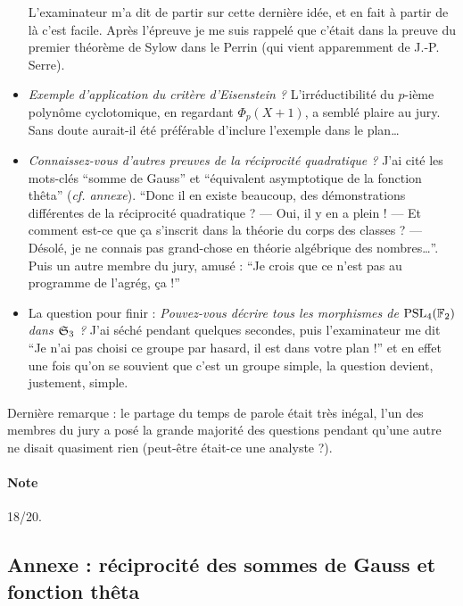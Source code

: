 \documentclass[a4paper, 11pt]{article}
\begin{document}
\begin{itemize}
  L'examinateur m'a dit de partir sur cette dernière idée, et en fait à partir
  de là c'est facile. Après l'épreuve je me suis rappelé que c'était dans la
  preuve du premier théorème de Sylow dans le Perrin (qui vient apparemment de
  J.-P. Serre).
\item \emph{Exemple d'application du critère d'Eisenstein ?} L'irréductibilité
  du $p$-ième polynôme cyclotomique, en regardant $\Phi_p(X+1)$, a semblé plaire
  au jury. Sans doute aurait-il été préférable d'inclure l'exemple dans le plan…
\item \emph{Connaissez-vous d'autres preuves de la réciprocité quadratique ?}
  J'ai cité les mots-clés \enquote{somme de Gauss} et \enquote{équivalent
    asymptotique de la fonction thêta} (\emph{cf. annexe}). \enquote{Donc il en
    existe beaucoup, des démonstrations différentes de la réciprocité
    quadratique ? --- Oui, il y en a plein ! --- Et comment est-ce que ça
    s'inscrit dans la théorie du corps des classes ? --- Désolé, je ne connais
    pas grand-chose en théorie algébrique des nombres…}.
  Puis un autre membre du jury, amusé : \enquote{Je crois que ce n'est pas au
    programme de l'agrég, ça !}
\item La question pour finir : \emph{Pouvez-vous décrire tous les morphismes de
    $\mathrm{PSL}_4(\mathbb{F}_2)$ dans $\mathfrak{S}_3$ ?} J'ai séché pendant quelques secondes,
  puis l'examinateur me dit \enquote{Je n'ai pas choisi ce groupe par hasard, il
    est dans votre plan !} et en effet une fois qu'on se souvient que c'est un
  groupe simple, la question devient, justement, simple.
\end{itemize}

Dernière remarque : le partage du temps de parole était très inégal, l'un des
membres du jury a posé la grande majorité des questions pendant qu'une autre ne
disait quasiment rien (peut-être était-ce une analyste ?).

\paragraph{Note} 18/20.

\newpage

\subsection*{Annexe : réciprocité des sommes de Gauss et fonction thêta}

\def\N{\mathbb{N}}
\def\R{\mathbb{R}}
\def\Re{\textnormal{Re}}
\end{document}
